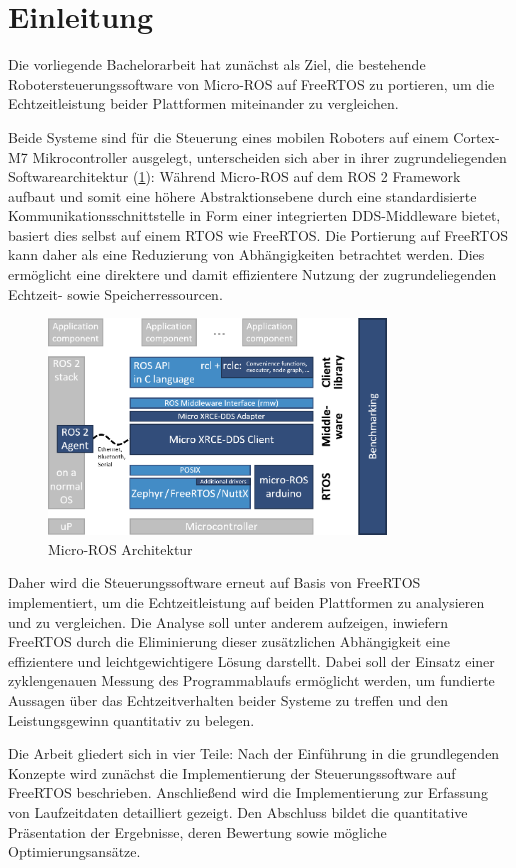 \section{Einleitung}

Die vorliegende Bachelorarbeit hat zunächst als Ziel, die bestehende
Robotersteuerungssoftware von Micro-ROS auf FreeRTOS zu portieren, um die
Echtzeitleistung beider Plattformen miteinander zu vergleichen.

Beide Systeme sind für die Steuerung eines mobilen Roboters auf einem Cortex-M7
Mikrocontroller ausgelegt, unterscheiden sich aber in ihrer zugrundeliegenden
Softwarearchitektur (\ref{fig:micro_ros_arch}): Während Micro-ROS auf dem
\ac{ROS 2} Framework aufbaut und somit eine höhere Abstraktionsebene durch eine
standardisierte Kommunikationsschnittstelle in Form einer integrierten
\ac{DDS}-Middleware bietet, basiert dies selbst auf einem \ac{RTOS} wie
FreeRTOS. Die Portierung auf FreeRTOS kann daher als eine Reduzierung von
Abhängigkeiten betrachtet werden. Dies ermöglicht eine direktere und damit
effizientere Nutzung der zugrundeliegenden Echtzeit- sowie Speicherressourcen.

\begin{figure}[htb] \centering
    \includegraphics[width=0.8\textwidth]{assets/Micro-ROS_architecture}
    \caption{Micro-ROS Architektur\cite[S. 6]{koubaa2023}}
    \label{fig:micro_ros_arch}
\end{figure}

Daher wird die Steuerungssoftware erneut auf Basis von FreeRTOS implementiert,
um die Echtzeitleistung auf beiden Plattformen zu analysieren und zu
vergleichen. Die Analyse soll unter anderem aufzeigen, inwiefern FreeRTOS durch
die Eliminierung dieser zusätzlichen Abhängigkeit eine effizientere und
leichtgewichtigere Lösung darstellt. Dabei soll der Einsatz einer zyklengenauen
Messung des Programmablaufs ermöglicht werden, um fundierte Aussagen über das
Echtzeitverhalten beider Systeme zu treffen und den Leistungsgewinn quantitativ
zu belegen.

Die Arbeit gliedert sich in vier Teile: Nach der Einführung in die grundlegenden
Konzepte wird zunächst die Implementierung der Steuerungssoftware auf FreeRTOS
beschrieben. Anschließend wird die Implementierung zur Erfassung von
Laufzeitdaten detailliert gezeigt. Den Abschluss bildet die quantitative
Präsentation der Ergebnisse, deren Bewertung sowie mögliche Optimierungsansätze.
